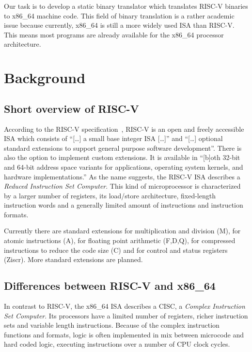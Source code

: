\documentclass[course=eragp]{aspdoc}
\begin{document}
\par


\par

Our task is to
develop a static binary translator which translates RISC-V binaries to x86\_64 machine code. This
field of binary translation is a rather academic issue because currently, x86\_64 is still a
more widely used ISA than RISC-V.\cite{riscv_rises} This means most programs are already available for the x86\_64
processor architecture.

\section{Background}
\subsection{Short overview of RISC-V}

According to the RISC-V specification~\cite{rvspec}, RISC-V is an open and freely accessible ISA
which consists of ``[\ldots] a small base integer ISA [\ldots]'' and ``[\ldots] optional standard
extensions to support general purpose software development''\cite[p.~1]{rvspec}. There is also
the option to implement custom extensions. It is available in
``[b]oth 32-bit and 64-bit address space variants for applications, operating system kernels, and
hardware implementations.''\cite[p.~1]{rvspec} As the name suggests, the RISC-V ISA describes a
\emph{Reduced Instruction Set Computer}. This kind of microprocessor is characterized by a larger
number of registers, its load/store architecture, fixed-length instruction words and a generally
limited amount of instructions and instruction formats.\cite{RISCvCISC}

\par

Currently there are standard extensions for multiplication and division (M), for atomic instructions (A),
for floating point arithmetic (F,D,Q), for compressed instructions to reduce the code size (C) and
for control and status registers (Ziscr). More standard extensions are planned.\cite{rvspec}

\subsection{Differences between RISC-V and x86\_64}
In contrast to RISC-V, the x86\_64 ISA describes a CISC, a \emph{Complex Instruction Set Computer}.
Its processors have a limited number of registers, richer instruction sets and variable length
instructions. Because of the complex instruction functions and formats, logic is often implemented
in mix between microcode and hard coded logic, executing instructions over a number of CPU clock
cycles.\cite{RISCvCISC}
\end{document}
